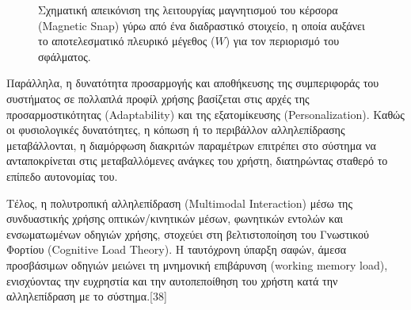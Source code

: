 \documentclass[twoside, a4paper, 11pt]{article}
\newcommand{\textlatin}[1]{\textenglish{#1}}
\begin{document}
\begin{figure}[!htbp]
\centering
{}
\caption{Σχηματική απεικόνιση της λειτουργίας μαγνητισμού του κέρσορα (Magnetic Snap) γύρω από ένα διαδραστικό στοιχείο, η οποία αυξάνει το αποτελεσματικό πλευρικό μέγεθος ($W$) για τον περιορισμό του σφάλματος.}
\label{fig:magnetic_snap}
\end{figure}


Παράλληλα, η δυνατότητα προσαρμογής και αποθήκευσης της συμπεριφοράς του συστήματος σε πολλαπλά προφίλ χρήσης βασίζεται στις αρχές της προσαρμοστικότητας (\textlatin{Adaptability}) και της εξατομίκευσης (\textlatin{Personalization}). Καθώς οι φυσιολογικές δυνατότητες, 
η κόπωση ή το περιβάλλον αλληλεπίδρασης μεταβάλλονται, η διαμόρφωση διακριτών παραμέτρων επιτρέπει στο σύστημα να ανταποκρίνεται στις μεταβαλλόμενες ανάγκες του χρήστη, διατηρώντας σταθερό το επίπεδο αυτονομίας του.

Τέλος, η πολυτροπική αλληλεπίδραση (\textlatin{Multimodal Interaction}) μέσω της συνδυαστικής χρήσης οπτικών/κινητικών μέσων, φωνητικών εντολών και ενσωματωμένων οδηγιών χρήσης, στοχεύει στη βελτιστοποίηση του Γνωστικού Φορτίου (\textlatin{Cognitive Load Theory}). 
Η ταυτόχρονη ύπαρξη σαφών, άμεσα προσβάσιμων οδηγιών μειώνει τη μνημονική επιβάρυνση (\textlatin{working memory load}), 
ενισχύοντας την ευχρηστία και την αυτοπεποίθηση του χρήστη κατά την αλληλεπίδραση με το σύστημα.[38]
\end{document}
